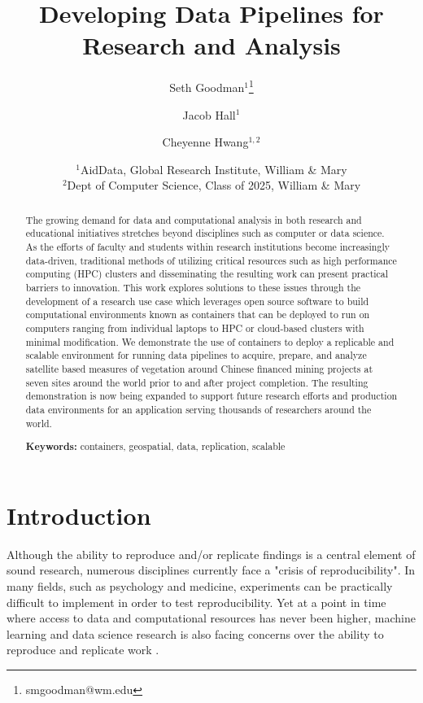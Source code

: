 \documentclass[a4paper]{article}
\title{Developing Data Pipelines for Research and Analysis}
\author{Seth Goodman$^1$\thanks{smgoodman@wm.edu} \and Jacob Hall$^1$ \and Cheyenne Hwang$^{1,2}$}
\date{
    $^1$AidData, Global Research Institute, William \& Mary \\ 
    $^2$Dept of Computer Science, Class of 2025, William \& Mary \\ 
}
\begin{document}
\maketitle


\begin{abstract}

The growing demand for data and computational analysis in both research and educational initiatives stretches beyond disciplines such as computer or data science. As the efforts of faculty and students within research institutions become increasingly data-driven, traditional methods of utilizing critical resources such as high performance computing (HPC) clusters and disseminating the resulting work can present practical barriers to innovation. This work explores solutions to these issues through the development of a research use case which leverages open source software to build computational environments known as containers that can be deployed to run on computers ranging from individual laptops to HPC or cloud-based clusters with minimal modification. We demonstrate the use of containers to deploy a replicable and scalable environment for running data pipelines to acquire, prepare, and analyze satellite based measures of vegetation around Chinese financed mining projects at seven sites around the world prior to and after project completion. The resulting demonstration is now being expanded to support future research efforts and production data environments for an application serving thousands of researchers around the world.

\noindent\textbf{Keywords:} containers, geospatial, data, replication, scalable

\end{abstract}


\section{Introduction}

Although the ability to reproduce and/or replicate findings is a central element of sound research, numerous disciplines currently face a "crisis of reproducibility"\citep{Baker2016}. In many fields, such as psychology and medicine, experiments can be practically difficult to implement in order to test reproducibility. Yet at a point in time where access to data and computational resources has never been higher, machine learning and data science research is also facing concerns over the ability to reproduce and replicate work \citep{Ding2020}.
\end{document}

